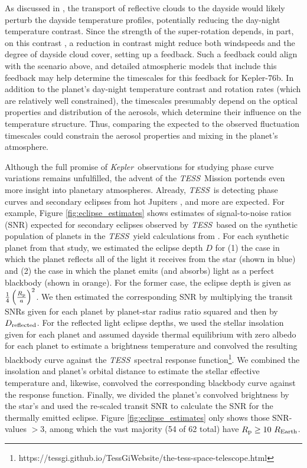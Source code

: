 \documentclass[manuscript]{aastex62}
\newcommand{\kepler}{{\it Kepler}}
\newcommand{\tess}{{\it TESS}}
\begin{document}
As discussed in \citet{2016NatAs...1E...4A}, the transport of reflective clouds to the dayside would likely perturb the dayside temperature profiles, potentially reducing the day-night temperature contrast. Since the strength of the super-rotation depends, in part, on this contrast \citep{2011ApJ...738...71S}, a reduction in contrast might reduce both windspeeds and the degree of dayside cloud cover, setting up a feedback. Such a feedback could align with the scenario above, and detailed atmospheric models that include this feedback may help determine the timescales for this feedback for Kepler-76b. In addition to the planet's day-night temperature contrast and rotation rates (which are relatively well constrained), the timescales presumably depend on the optical properties and distribution of the aerosols, which determine their influence on the temperature structure. Thus, comparing the expected to the observed fluctuation timescales could constrain the aerosol properties and mixing in the planet's atmosphere.

Although the full promise of \kepler\ observations for studying phase curve variations remains unfulfilled, the advent of the \tess\ Mission portends even more insight into planetary atmospheres. Already, \tess\  is detecting phase curves and secondary eclipses from hot Jupiters \citep{2018arXiv181106020S}, and more are expected. For example, Figure \ref{fig:eclipse_estimates} shows estimates of signal-to-noise ratios (SNR) expected for secondary eclipses observed by \tess\ based on the synthetic population of planets in the \tess\ yield calculations from \citet{2018ApJS..239....2B}. For each synthetic planet from that study, we estimated the eclipse depth $D$ for (1) the case in which the planet reflects all of the light it receives from the star (shown in blue) and (2) the case in which the planet emits (and absorbs) light as a perfect blackbody (shown in orange). For the former case, the eclipse depth is given as $\frac{1}{4} \left( \frac{R_{\rm p}}{a} \right)^2$. We then estimated the corresponding SNR by multiplying the transit SNRs given for each planet by planet-star radius ratio squared and then by $D_{\rm reflected}$. For the reflected light eclipse depths, we used the stellar insolation given for each planet and assumed dayside thermal equilibrium with zero albedo for each planet to estimate a brightness temperature and convolved the resulting blackbody curve against the \tess\ spectral response function\footnote{https://tessgi.github.io/TessGiWebsite/the-tess-space-telescope.html}. We combined the insolation and planet's orbital distance to estimate the stellar effective temperature and, likewise, convolved the corresponding blackbody curve against the response function. Finally, we divided the planet's convolved brightness by the star's and used the re-scaled transit SNR to calculate the SNR for the thermally emitted eclipse. Figure \ref{fig:eclipse_estimates} only shows those SNR-values $> 3$, among which the vast majority (54 of 62 total) have $R_{\rm p} \geq 10\ R_{\rm Earth}$. 
\end{document}
